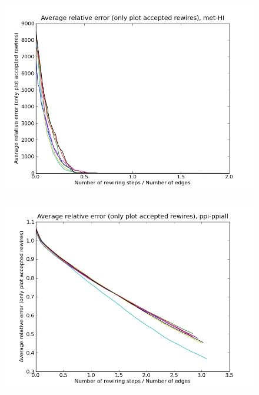 \documentclass[12pt]{article}
\begin{document}
\begin{figure}[p]
\includegraphics[scale=0.75]{acceptedOnly-met-HI.png}\\
\end{figure}


\begin{figure}[p]
\includegraphics[scale=0.75]{acceptedOnly-ppi-ppiall.png}\\
\end{figure}
\end{document}
